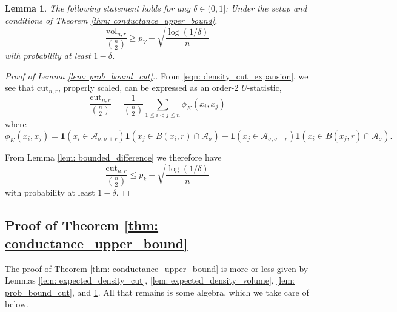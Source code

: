 \documentclass{article}
\newcommand{\vol}{\mathrm{vol}}
\newcommand{\1}{\mathbf{1}}
\newcommand{\cut}{\mathrm{cut}}
\newcommand{\Aset}{\mathcal{A}}
\newcommand{\Asig}{\Aset_{\sigma}}
\newcommand{\Asigr}{\Aset_{\sigma,\sigma + r}}
\theoremstyle{aldenthm}
\newtheorem{lemma}{Lemma}
\begin{document}
\begin{lemma}
	\label{lem: prob_bound_vol}
	The following statement holds for any $\delta \in (0,1]$: Under the setup and conditions of Theorem \ref{thm: conductance_upper_bound}, 
	\begin{equation}
	\label{eqn: denominator_additive_bound}
	\frac{\vol_{n,r}}{{n \choose 2}} \geq p_V - \sqrt{\frac{\log(1/\delta)}{n}}
	\end{equation}
	with probability at least $1 - \delta$. 
\end{lemma}

\begin{proof}[Proof of Lemma \ref{lem: prob_bound_cut}.]
	From \eqref{eqn: density_cut_expansion}, we see that $\cut_{n,r}$, properly scaled, can be expressed as an order-$2$ $U$-statistic,
	\begin{equation*}
	\frac{\cut_{n,r}}{{n \choose 2}} = \frac{1}{{n \choose 2}} \sum_{1 \leq i < j \leq n} \phi_K(x_i, x_j)
	\end{equation*}
	where 
	\begin{equation*}
	\phi_K(x_i,x_j) = \1(x_i \in \Asigr) \1(x_j \in B(x_i,r) \cap \Asig) + \1(x_j \in \Asigr) \1(x_i \in B(x_j,r) \cap \Asig).
	\end{equation*}
	
	From Lemma \ref{lem: bounded_difference} we therefore have
	\begin{equation*}
	\frac{\cut_{n,r}}{{n \choose 2}} \leq p_k + \sqrt{\frac{\log(1/\delta)}{n}}
	\end{equation*}
	with probability at least $1 - \delta$. 
\end{proof}

\subsection{Proof of Theorem \ref{thm: conductance_upper_bound}}
\label{sec: proof_of_theorem_1}

The proof of Theorem \ref{thm: conductance_upper_bound} is more or less given by Lemmas \ref{lem: expected_density_cut}, \ref{lem: expected_density_volume}, \ref{lem: prob_bound_cut}, and \ref{lem: prob_bound_vol}. All that remains is some algebra, which we take care of below.
\end{document}
